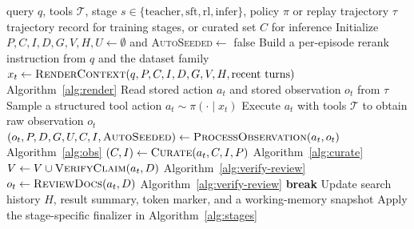 \documentclass{article}
\newcommand{\sys}{\texttt{Harness-1}\xspace}
\newcommand{\verify}{\texttt{verify}\xspace}
\newcommand{\curate}{\texttt{curate}\xspace}
\begin{document}
\begin{algorithm}[t]
\caption{\sys stage driver.}
\label{alg:harness-driver}
\small
\begin{algorithmic}[1]
\REQUIRE query $q$, tools $\mathcal{T}$, stage $s\in\{\mathrm{teacher},\mathrm{sft},\mathrm{rl},\mathrm{infer}\}$, policy $\pi$ or replay trajectory $\tau$
\ENSURE trajectory record for training stages, or curated set $C$ for inference
\STATE Initialize $P,C,I,D,G,V,H,U\leftarrow\emptyset$ and \textsc{AutoSeeded}$\leftarrow$ false
\STATE Build a per-episode rerank instruction from $q$ and the dataset family
  \STATE $x_t\leftarrow\textsc{RenderContext}(q,P,C,I,D,G,V,H,\text{recent turns})$ \hfill Algorithm~\ref{alg:render}
    \STATE Read stored action $a_t$ and stored observation $o_t$ from $\tau$
  \ELSE
    \STATE Sample a structured tool action $a_t\sim\pi(\cdot\mid x_t)$
    \STATE Execute $a_t$ with tools $\mathcal{T}$ to obtain raw observation $o_t$
  \ENDIF
    \STATE $(o_t,P,D,G,U,C,I,\textsc{AutoSeeded})\leftarrow\textsc{ProcessObservation}(a_t,o_t)$ \hfill Algorithm~\ref{alg:obs}
  \ELSIF{$a_t=\curate$}
    \STATE $(C,I)\leftarrow\textsc{Curate}(a_t,C,I,P)$ \hfill Algorithm~\ref{alg:curate}
  \ELSIF{$a_t=\verify$}
    \STATE $V\leftarrow V\cup\textsc{VerifyClaim}(a_t,D)$ \hfill Algorithm~\ref{alg:verify-review}
    \STATE $o_t\leftarrow\textsc{ReviewDocs}(a_t,D)$ \hfill Algorithm~\ref{alg:verify-review}
    \STATE \textbf{break}
  \ENDIF
  \STATE Update search history $H$, result summary, token marker, and a working-memory snapshot
\ENDFOR
\STATE Apply the stage-specific finalizer in Algorithm~\ref{alg:stages}
\end{algorithmic}
\end{algorithm}
\end{document}
